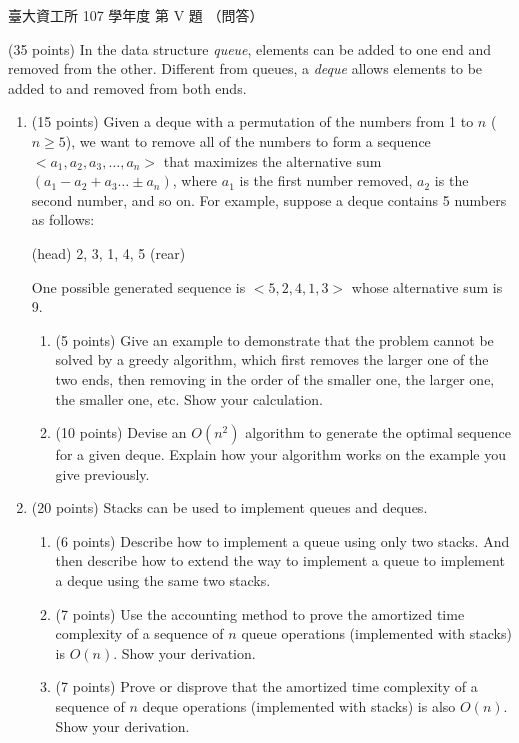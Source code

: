 \begin{pastexam}[label={px:ntu-107-dsa-05}]{臺大資工所 107 學年度 第 V 題}
（問答）

(35 points) In the data structure \textit{queue}, elements can be added to one end and removed
from the other. Different from queues, a \textit{deque} allows elements to be added to and removed
from both ends.
\begin{enumerate}[label=(\alph*)]
\item (15 points) Given a deque with a permutation of the numbers from 1 to $n$ ($n\ge5$), we want
to remove all of the numbers to form a sequence $<a_1,a_2,a_3,\ldots,a_n>$ that maximizes the
alternative sum $(a_1-a_2+a_3\ldots\pm a_n)$, where $a_1$ is the first number removed, $a_2$ is the
second number, and so on. For example, suppose a deque contains 5 numbers as follows:

\hspace*{2em}(head) 2, 3, 1, 4, 5 (rear)

One possible generated sequence is $<5,2,4,1,3>$ whose alternative sum is 9.
\begin{enumerate}[label=(\arabic*)]
\item (5 points) Give an example to demonstrate that the problem cannot be solved by a greedy
algorithm, which first removes the larger one of the two ends, then removing in the order of the
smaller one, the larger one, the smaller one, etc. Show your calculation.
\item (10 points) Devise an $O(n^2)$ algorithm to generate the optimal sequence for a given deque.
Explain how your algorithm works on the example you give previously.
\end{enumerate}
\item (20 points) Stacks can be used to implement queues and deques.
\begin{enumerate}[label=(\arabic*)]
\item (6 points) Describe how to implement a queue using only two stacks. And then describe how to
extend the way to implement a queue to implement a deque using the same two stacks.
\item (7 points) Use the accounting method to prove the amortized time complexity of a sequence of
$n$ queue operations (implemented with stacks) is $O(n)$. Show your derivation.
\item (7 points) Prove or disprove that the amortized time complexity of a sequence of $n$ deque
operations (implemented with stacks) is also $O(n)$. Show your derivation.
\end{enumerate}
\end{enumerate}
\end{pastexam}

